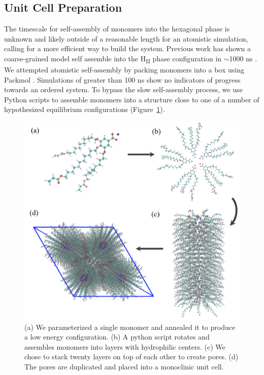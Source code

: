 \documentclass[journal=jpcbfk,manusciprt=article]{achemso}
\begin{document}
  \subsection{Unit Cell Preparation}

  The timescale for self-assembly of monomers into the hexagonal phase is
  unknown and likely outside of a reasonable length for an atomistic simulation,
  calling for a more efficient way to build the system. Previous work has shown
  a coarse-grained model self assemble into the H\textsubscript{II} phase
  configuration in $\sim$1000 ns \cite{mondal_self-assembly_2013}.  We
  attempted atomistic self-assembly by packing monomers into a box using Packmol
  \cite{martinez_packmol:_2009}. Simulations of greater than 100 ns show no
  indicators of progress towards an ordered system. To bypass the slow
  self-assembly process, we use Python scripts to assemble monomers into a
  structure close to one of a number of hypothesized equilibrium configurations
  (Figure~\ref{fig:python}).

  \begin{figure}
	\centering
	\includegraphics[width=0.75\linewidth]{build.PNG} %
	\caption{(a) We parameterized a single monomer and annealed it to produce a low energy
		configuration. (b) A python script rotates and assembles monomers into layers with 
		hydrophilic centers. (c) We chose to stack twenty layers on top of each other to create
		pores. (d) The pores are duplicated and placed into a monoclinic unit cell.}\label{fig:python}
  \end{figure}
  
\end{document}
